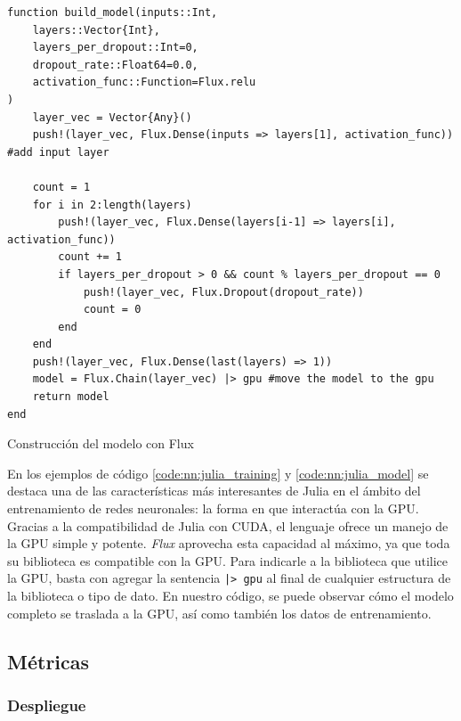 \documentclass[11pt]{article}
\let\Oldsubsection\subsection
\renewcommand{\subsection}{\FloatBarrier\Oldsubsection}
\let\Oldsubsubsection\subsubsection
\renewcommand{\subsubsection}{\FloatBarrier\Oldsubsubsection}
\begin{document}
\begin{listing}[h]
\begin{verbatim}
function build_model(inputs::Int,
    layers::Vector{Int},
    layers_per_dropout::Int=0,
    dropout_rate::Float64=0.0,
    activation_func::Function=Flux.relu
)
    layer_vec = Vector{Any}()
    push!(layer_vec, Flux.Dense(inputs => layers[1], activation_func)) #add input layer

    count = 1
    for i in 2:length(layers)
        push!(layer_vec, Flux.Dense(layers[i-1] => layers[i], activation_func))
        count += 1
        if layers_per_dropout > 0 && count % layers_per_dropout == 0
            push!(layer_vec, Flux.Dropout(dropout_rate))
            count = 0
        end
    end
    push!(layer_vec, Flux.Dense(last(layers) => 1))
    model = Flux.Chain(layer_vec) |> gpu #move the model to the gpu
    return model
end
\end{verbatim}
\caption{Construcción del modelo con Flux}
\label{code:nn:julia_model}
\end{listing}

En los ejemplos de código \ref{code:nn:julia_training} y \ref{code:nn:julia_model} se destaca una de las características más interesantes de Julia en el ámbito del entrenamiento de redes neuronales: la forma en que interactúa con la GPU. Gracias a la compatibilidad de Julia con CUDA, el lenguaje ofrece un manejo de la GPU simple y potente. \textit{Flux} aprovecha esta capacidad al máximo, ya que toda su biblioteca es compatible con la GPU. Para indicarle a la biblioteca que utilice la GPU, basta con agregar la sentencia \lstinline{|> gpu} al final de cualquier estructura de la biblioteca o tipo de dato. En nuestro código, se puede observar cómo el modelo completo se traslada a la GPU, así como también los datos de entrenamiento.

\subsection{Métricas}

\subsubsection{Despliegue}
\end{document}
